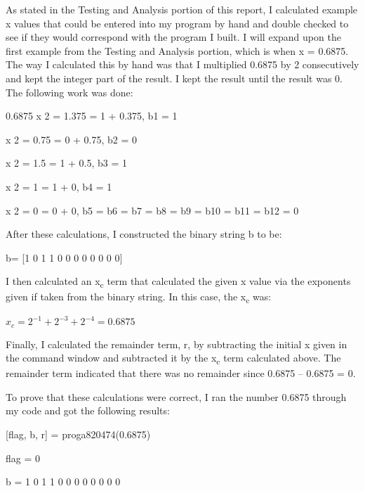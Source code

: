 \documentclass{article}
\begin{document}
{\color{black}  As stated in the Testing and Analysis portion of this report, I calculated example x values that could be entered into my program by hand and double checked to see if they would correspond with the program I built.  I will expand upon the first example from the Testing and Analysis portion, which is when x = 0.6875.  The way I calculated this by hand was that I multiplied 0.6875 by 2 consecutively and kept the integer part of the result.  I kept the result until the result was 0.  The following work was done:
\par \medskip
    {\color{black} 0.6875 x 2 = 1.375 = 1 + 0.375, b1 = 1
    \par {} x 2 = 0.75 = 0 + 0.75, b2 = 0
\par {} x 2 = 1.5 = 1 + 0.5, b3 = 1
\par {} x 2 = 1 = 1 + 0, b4 = 1
\par {} x 2 = 0 = 0 + 0, b5 = b6 = b7 = b8 = b9 = b10 = b11 = b12 = 0
\par \medskip
    }
\par \medskip
      {\color{black} After these calculations, I constructed the binary string b to be:
      }
\par \medskip
    {\color{black} b= [1 0 1 1 0 0 0 0 0 0 0 0]
    }
\par \medskip
      {\color{black} I then calculated an x\textsubscript{c} term that calculated the given x value via the exponents given if taken from the binary string.  In this case, the x\textsubscript{c} was:
      }
\par \medskip
{\color{black} $x_c=2^{-1}+2^{-3}+2^{-4}=0.6875$
}
\par \medskip
      {\color{black} Finally, I calculated the remainder term, r, by subtracting the initial x given in the command window and subtracted it by the x\textsubscript{c} term calculated above.  The remainder term indicated that there was no remainder since 0.6875 – 0.6875 = 0.  
      }
\par \medskip      
      {\color{black} To prove that these calculations were correct, I ran the number 0.6875 through my code and got the following results:
      }
\par \medskip
{\color{black}  
[flag, b, r] = proga820474(0.6875)
\par \medskip
flag =
     0
\par \medskip
b =
     1
     0
     1
     1
     0
     0
     0
     0
     0
     0
     0
     0
\par \medskip
}}
\end{document}
